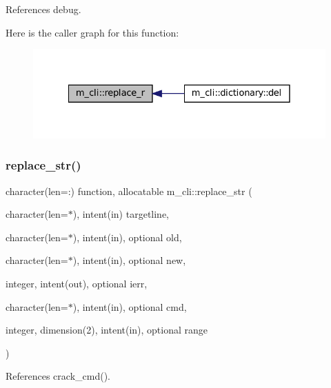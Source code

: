 References debug.

Here is the caller graph for this function\+:\nopagebreak
\begin{figure}[H]
\begin{center}
\leavevmode
\includegraphics[width=328pt]{namespacem__cli_ab3b33abc8a6da174d3f27c2f2203038c_icgraph}
\end{center}
\end{figure}
\mbox{\label{namespacem__cli_a40e02b1c9fc580ddd410bb24017fab8c}} 
\subsubsection{\texorpdfstring{replace\+\_\+str()}{replace\_str()}}
{\footnotesize\ttfamily character(len=\+:) function, allocatable m\+\_\+cli\+::replace\+\_\+str (\begin{DoxyParamCaption}\item[{character(len=$\ast$), intent(in)}]{targetline,  }\item[{character(len=$\ast$), intent(in), optional}]{old,  }\item[{character(len=$\ast$), intent(in), optional}]{new,  }\item[{integer, intent(out), optional}]{ierr,  }\item[{character(len=$\ast$), intent(in), optional}]{cmd,  }\item[{integer, dimension(2), intent(in), optional}]{range }\end{DoxyParamCaption})\hspace{0.3cm}{\ttfamily [private]}}



References crack\+\_\+cmd().

